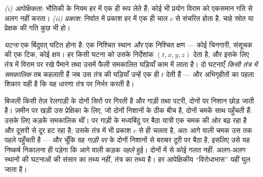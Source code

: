 \begin{theorem}[विशिष्ट आपेक्षिकता के अभिगृहीत]\label{thm:b3:relativistic-kinematics:postulates}
\emph{(i) आपेक्षिकता:} भौतिकी के नियम हर  में एक
ही रूप लेते हैं; कोई भी प्रयोग विराम को एकसमान गति से अलग नहीं करता।
\emph{(ii) प्रकाश:} निर्वात में प्रकाश हर  में एक
ही चाल $c$ से संचरित होता है, चाहे स्रोत या प्रेक्षक की गति कुछ भी
हो।
\end{theorem}
\admitted

\begin{definition}\label{def:b3:relativistic-kinematics:event}
\emph{घटना} एक बिंदुवत् घटित होना है: एक निश्चित स्थान \emph{और} एक
निश्चित क्षण --- कोई चिनगारी, संसूचक की एक टिक, कोई क्षय। हर  किसी घटना को उसके निर्देशांक $(t, x, y, z)$ देता है, और
इसके लिए तंत्र में विराम पर रखे पैमाने तथा उसमें फैली समकालित घड़ियाँ
काम में लाता है। दो घटनाएँ \emph{किसी तंत्र में समकालिक} तब कहलाती हैं
जब उस तंत्र की घड़ियाँ उन्हें एक ही $t$ देती हैं --- और अभिगृहीतों का
पहला शिकार यही है कि यह धारणा तंत्र पर निर्भर करती है।
\end{definition}

\begin{example}[रेलगाड़ी और बिजली की दो कड़कें]\label{ex:b3:relativistic-kinematics:train}
बिजली किसी तेज़ रेलगाड़ी के दोनों सिरों पर गिरती है और गाड़ी तथा पटरी,
दोनों पर निशान छोड़ जाती है। ज़मीन पर खड़ी उस प्रेक्षिका के लिए, जो
दोनों निशानों के ठीक बीच है, दोनों चमकें साथ पहुँचती हैं: उसके लिए
कड़कें समकालिक थीं। पर गाड़ी के मध्यबिंदु पर बैठा यात्री एक चमक की ओर
बढ़ रहा है और दूसरी से दूर हट रहा है; उसके तंत्र में भी प्रकाश $c$ से
ही चलता है, अतः आगे वाली चमक उस तक पहले पहुँचती है --- और चूँकि वह
\emph{गाड़ी पर} के दोनों निशानों से बराबर दूरी पर बैठा है, इसलिए उसे यह
निष्कर्ष निकालना ही पड़ेगा कि आगे वाली कड़क \emph{पहले} हुई। दोनों में
से कोई गलत नहीं: अलग-अलग स्थानों की घटनाओं की
 संसार का तथ्य नहीं, तंत्र का तथ्य है। हर आपेक्षिकीय
``विरोधाभास'' यहीं घुल जाता है।
\end{example}

